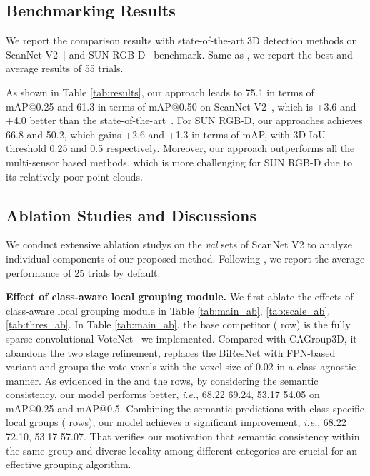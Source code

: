 \documentclass{article}
\begin{document}
\subsection{Benchmarking Results}\label{sec:compare}
We report the comparison results with state-of-the-art 3D detection methods on ScanNet V2~\cite{dai2017scannet}] and SUN RGB-D~\cite{sunrgbd} benchmark. Same as  \cite{liu2021group}, we report the best and average results of 55 trials.

As shown in Table \ref{tab:results}, our approach leads to 75.1 in terms of mAP@0.25 and 61.3 in terms of mAP@0.50 on ScanNet V2~\cite{dai2017scannet}, which is +3.6 and +4.0 better than the state-of-the-art~\cite{rukhovich2021fcaf3d}.  For SUN RGB-D, our approaches achieves 66.8 and 50.2, which gains +2.6 and +1.3 in terms of mAP, with 3D IoU threshold 0.25 and 0.5 respectively. Moreover, our approach outperforms all the multi-sensor based methods, which is more challenging for SUN RGB-D due to its relatively poor point clouds. 

\subsection{Ablation Studies and Discussions}\label{sec:ab}
We conduct extensive ablation studys on the \textit{val} sets of ScanNet V2 to analyze individual components of our proposed method. Following \cite{liu2021group}, we report the average performance of 25 trials by default.

\textbf{Effect of class-aware local grouping module.} We first ablate the effects of class-aware local grouping module in Table \ref{tab:main_ab}, \ref{tab:scale_ab}, \ref{tab:thres_ab}. In Table \ref{tab:main_ab}, the base competitor ( row) is the fully sparse convolutional VoteNet~\cite{qi2019deep} we implemented. Compared with CAGroup3D, it abandons the two stage refinement, replaces the BiResNet with FPN-based variant and groups the vote voxels with the voxel size of 0.02 in a class-agnostic manner. As evidenced in the  and the  rows, by considering the semantic consistency, our model performs better, \textit{i.e.}, 68.22  69.24, 53.17  54.05 on mAP@0.25 and mAP@0.5.  Combining the semantic predictions with class-specific local groups ( rows), our model achieves a significant improvement, \textit{i.e.}, 68.22  72.10, 53.17  57.07. That verifies our motivation that semantic consistency within the same group and diverse locality among different categories are crucial for an effective grouping algorithm. 
\end{document}
